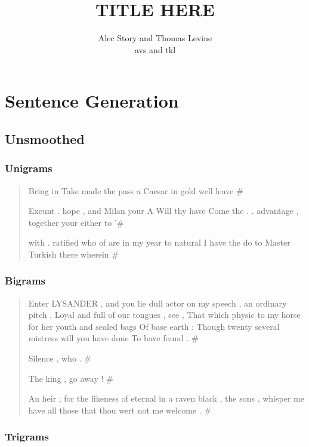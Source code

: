 \documentclass{article}
\title{TITLE HERE}
\author{Alec Story and Thomas Levine\\\small{avs\osn{38} and tkl\osn{22}}}
\begin{document}
\maketitle
\section*{Sentence Generation}

	\subsection*{Unsmoothed}

		\subsubsection*{Unigrams}

			\begin{quote}

			Bring in Take made the pass a Caesar in gold well leave \#

			Exeunt . hope , and Milan your A Will thy have Come the . .
			advantage , together your either to '\#

			with . ratified who of are in my year to natural I have the do to
			Master Turkish there wherein \#

			\end{quote}

		\subsubsection*{Bigrams}

			\begin{quote}

			Enter LYSANDER , and you lie dull actor on my speech , an ordinary
			pitch , Loyal and full of our tongues , see , That which physic to
			my horse for her youth and sealed bags Of base earth ; Though twenty
			several mistress will you have done To have found . \#

			Silence , who . \#

			The king , go away ! \#

			An heir ; for the likeness of eternal in a raven black , the sons ,
			whisper me have all those that thou wert not me welcome . \#

			\end{quote}

		\subsubsection*{Trigrams}
\end{document}

